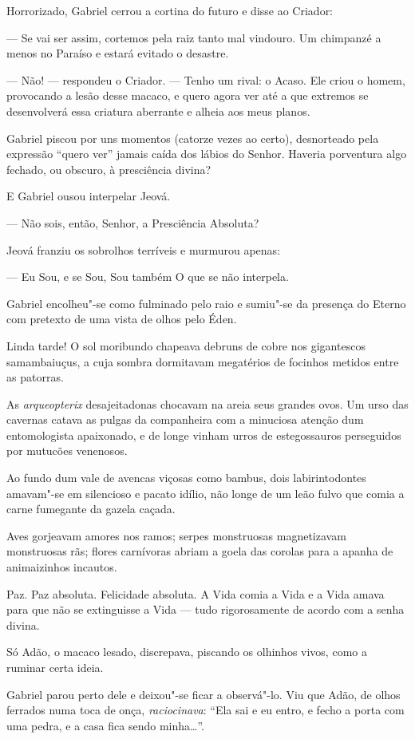Horrorizado, Gabriel cerrou a cortina do futuro e disse ao Criador:

--- Se vai ser assim, cortemos pela raiz tanto mal vindouro. Um
chimpanzé a menos no Paraíso e estará evitado o desastre.

--- Não! --- respondeu o Criador. --- Tenho um rival: o Acaso. Ele criou
o homem, provocando a lesão desse macaco, e quero agora ver até a que
extremos se desenvolverá essa criatura aberrante e alheia aos meus
planos.

Gabriel piscou por uns momentos (catorze vezes ao certo), desnorteado
pela expressão ``quero ver'' jamais caída dos lábios do Senhor. Haveria
porventura algo fechado, ou obscuro, à presciência divina?

E Gabriel ousou interpelar Jeová.

--- Não sois, então, Senhor, a Presciência Absoluta?

Jeová franziu os sobrolhos terríveis e murmurou apenas:

--- Eu Sou, e se Sou, Sou também O que se não interpela.

Gabriel encolheu"-se como fulminado pelo raio e sumiu"-se da presença do
Eterno com pretexto de uma vista de olhos pelo Éden.

Linda tarde! O sol moribundo chapeava debruns de cobre nos gigantescos
samambaiuçus, a cuja sombra dormitavam megatérios de focinhos metidos
entre as patorras.

As \emph{arqueopterix} desajeitadonas chocavam na areia seus grandes
ovos. Um urso das cavernas catava as pulgas da companheira com a
minuciosa atenção dum entomologista apaixonado, e de longe vinham urros
de estegossauros perseguidos por mutucões venenosos.

Ao fundo dum vale de avencas viçosas como bambus, dois labirintodontes
amavam"-se em silencioso e pacato idílio, não longe de um leão fulvo que
comia a carne fumegante da gazela caçada.

Aves gorjeavam amores nos ramos; serpes monstruosas magnetizavam
monstruosas rãs; flores carnívoras abriam a goela das corolas para a
apanha de animaizinhos incautos.

Paz. Paz absoluta. Felicidade absoluta. A Vida comia a Vida e a Vida
amava para que não se extinguisse a Vida --- tudo rigorosamente de
acordo com a senha divina.

Só Adão, o macaco lesado, discrepava, piscando os olhinhos vivos, como a
ruminar certa ideia.

Gabriel parou perto dele e deixou"-se ficar a observá"-lo. Viu que Adão,
de olhos ferrados numa toca de onça, \emph{raciocinava}: ``Ela sai e eu
entro, e fecho a porta com uma pedra, e a casa fica sendo minha\ldots{}''.

